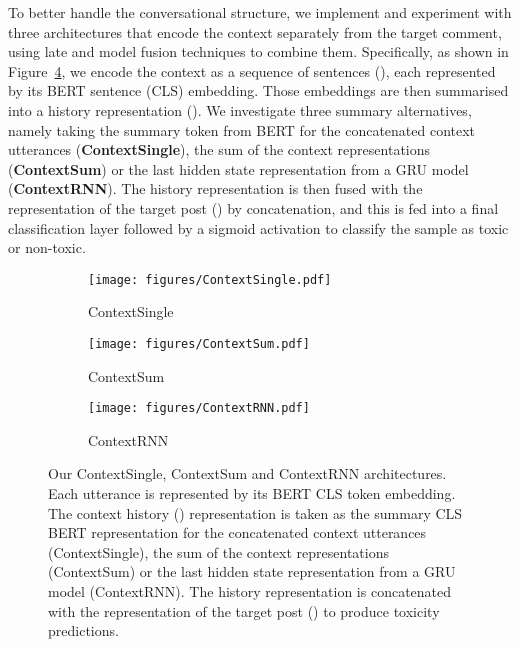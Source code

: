 \documentclass[acmsmall]{acmart}
\begin{document}
To better handle the conversational structure, we implement and experiment with three architectures that encode the context separately from the target comment, using late and model fusion techniques to combine them. Specifically, as shown in Figure~\ref{fig:context-architecture}, we encode the context as a sequence of sentences (), each represented by its BERT sentence (CLS) embedding. Those embeddings are then summarised into a history representation (). We investigate three summary alternatives, namely taking the summary token from BERT for the concatenated context utterances ({\bf ContextSingle}), the sum of the context representations ({\bf ContextSum}) or the last hidden state representation from a GRU model ({\bf ContextRNN}). The history representation is then fused with the representation of the target post () by concatenation, and this is fed into a final classification layer followed by a sigmoid activation to  classify the sample as toxic or non-toxic. 

\begin{figure}[!h]
\begin{subfigure}{0.33\textwidth}
  \texttt{[image: figures/ContextSingle.pdf]}
  \caption{ContextSingle}
  \label{fig:contextsingle}
\end{subfigure}\begin{subfigure}{0.33\textwidth}
  \texttt{[image: figures/ContextSum.pdf]}
  \caption{ContextSum}
  \label{fig:contextsum}
\end{subfigure}
\begin{subfigure}{0.33\textwidth}
  \texttt{[image: figures/ContextRNN.pdf]}
  \caption{ContextRNN}
  \label{fig:contextrnn}
\end{subfigure}
\caption{Our ContextSingle, ContextSum and ContextRNN architectures. Each utterance  is represented by its BERT CLS token embedding. The context history () representation is taken as the summary CLS BERT representation for the concatenated context utterances (ContextSingle), the sum of the context representations (ContextSum) or the last hidden state representation from a GRU model (ContextRNN). The history representation is concatenated with the representation of the target post () to produce toxicity predictions.}
\label{fig:context-architecture}
\end{figure}
\end{document}
